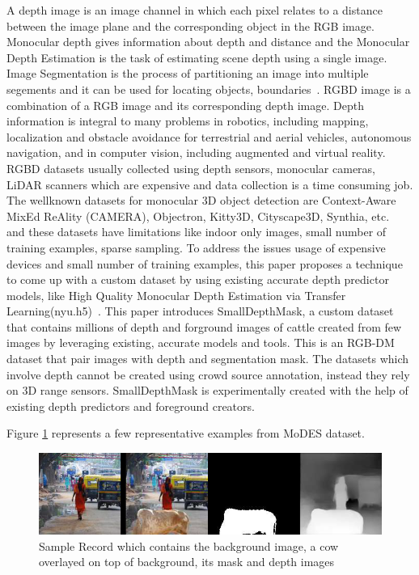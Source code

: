 \documentclass{article}
\begin{document}
A depth image is an image channel in which each pixel relates to a distance between the image plane and the corresponding object in the RGB image.
Monocular depth gives information about depth and distance and the Monocular Depth Estimation is the task of estimating scene depth 
using a single image\cite{abuolaim2020defocus}. 
Image Segmentation is the process of partitioning an image into multiple segements and it can be used for locating objects, boundaries~\cite{amza2012review}. 
RGBD image is a combination of a RGB image and its corresponding depth image\cite{zhang2018deep}.
 Depth information is integral to many problems in
robotics, including mapping, localization and obstacle avoidance for terrestrial and aerial vehicles, autonomous navigation, and in computer vision,
 including augmented and virtual reality\cite{marchand2015pose}. RGBD datasets usually collected using depth sensors, monocular cameras, 
 LiDAR scanners which are expensive and data collection is a time consuming job. The wellknown datasets for monocular 3D object detection are Context-Aware MixEd ReAlity (CAMERA), Objectron, Kitty3D, Cityscape3D, Synthia, etc.~\cite{} and these datasets have limitations like indoor only images, small number of training examples, sparse sampling. To address the issues usage of expensive devices and small number of training examples, this paper proposes a technique to come up with a custom dataset 
 by using existing accurate depth predictor models, like High Quality Monocular Depth Estimation via Transfer Learning(nyu.h5)~\cite{alhashim2018high}. This paper introduces SmallDepthMask, 
 a custom dataset that contains millions of depth and forground images of cattle created from few images by leveraging existing, 
 accurate models and tools. This is an RGB-DM dataset that pair images with depth and segmentation mask. The datasets which involve depth cannot be 
 created using crowd source annotation, instead they rely on 3D range sensors. SmallDepthMask is experimentally created with the help of existing 
 depth predictors and foreground creators.

Figure \ref{fig:sampledatarecord} represents a few representative examples from MoDES dataset.

\begin{figure}[h!]
\centering
  \includegraphics[width=1\textwidth]{samplerecord.png}
  \caption{Sample Record which contains the background image, a cow overlayed on top of background, its mask and depth images}
  \label{fig:sampledatarecord}
\end{figure}
\end{document}
